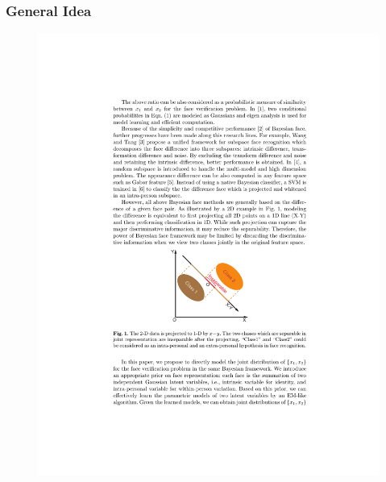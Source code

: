 \documentclass{beamer}
\begin{document}
\begin{frame}
\frametitle{General Idea}
\begin{figure}[H]
\centering
\includegraphics[height=\textheight, trim=3.25in 3.4in 3.25in 5.4in, clip]{Chen2}
\end{figure}
\end{frame}
\end{document}
